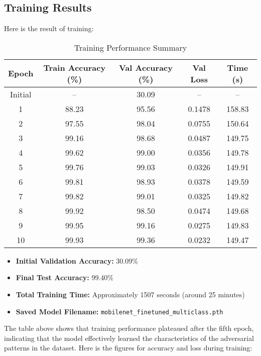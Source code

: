 \documentclass[a4paper,12pt]{report}%
\begin{document}
\newpage
\subsection{Training Results}
Here is the result of training:

\begin{table}[H]
\centering
\caption{Training Performance Summary}
\begin{tabular}{|c|c|c|c|c|}
\hline
Epoch & Train Accuracy (\%) & Val Accuracy (\%) & Val Loss & Time (s) \\
\hline
Initial & -- & 30.09 & -- & -- \\
1  & 88.23 & 95.56 & 0.1478 & 158.83 \\
2  & 97.55 & 98.04 & 0.0755 & 150.64 \\
3  & 99.16 & 98.68 & 0.0487 & 149.75 \\
4  & 99.62 & 99.00 & 0.0356 & 149.78 \\
5  & 99.76 & 99.03 & 0.0326 & 149.91 \\
6  & 99.81 & 98.93 & 0.0378 & 149.59 \\
7  & 99.82 & 99.01 & 0.0325 & 149.82 \\
8  & 99.92 & 98.50 & 0.0474 & 149.68 \\
9  & 99.95 & 99.16 & 0.0275 & 149.83 \\
10 & 99.93 & 99.36 & 0.0232 & 149.47 \\
\hline
\end{tabular}
\label{tab:training_results}
\end{table}
\begin{itemize}
    \item \textbf{Initial Validation Accuracy:} 30.09\%
    \item \textbf{Final Test Accuracy:} 99.40\%
    \item \textbf{Total Training Time:} Approximately 1507 seconds (around 25 minutes)
    \item \textbf{Saved Model Filename:} \texttt{mobilenet\_finetuned\_multiclass.pth}
\end{itemize}


The table above shows that training performance plateaued after the fifth epoch, indicating that the model effectively learned the characteristics of the adversarial patterns in the dataset. Here is the figures for accuracy and loss during training:
\end{document}
